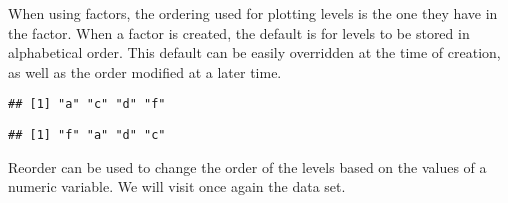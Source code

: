 \documentclass[krantz2]{krantz}\usepackage{knitr}%
\begin{document}
\begin{explainbox}
When using factors, the ordering used for plotting levels is the one they have in the factor. When a factor is created, the default is for levels to be stored in alphabetical order. This default can be easily overridden at the time of creation, as well as the order modified at a later time.

\begin{knitrout}\footnotesize
{}\color{fgcolor}\begin{kframe}
\begin{alltt}
 \hlkwb{<-} \hlstd{(}\hlstd{(}\hlstd{,} \hlstd{,} \hlstd{,} \hlstd{,} \hlstd{,} \hlstd{))}
\end{alltt}
\begin{verbatim}
## [1] "a" "c" "d" "f"
\end{verbatim}
\end{kframe}
\end{knitrout}

\begin{knitrout}\footnotesize
{}\color{fgcolor}\begin{kframe}
\begin{alltt}
 \hlkwb{<-} \hlstd{(}\hlstd{(}\hlstd{,} \hlstd{,} \hlstd{,} \hlstd{,} \hlstd{,} \hlstd{),}
                       \hlstd{=} \hlstd{(}\hlstd{,} \hlstd{,} \hlstd{,} \hlstd{))}
\end{alltt}
\begin{verbatim}
## [1] "f" "a" "d" "c"
\end{verbatim}
\end{kframe}
\end{knitrout}

Reorder can be used to change the order of the levels based on the values of a numeric variable. We will visit once again the  data set.


\end{explainbox}
\end{document}
